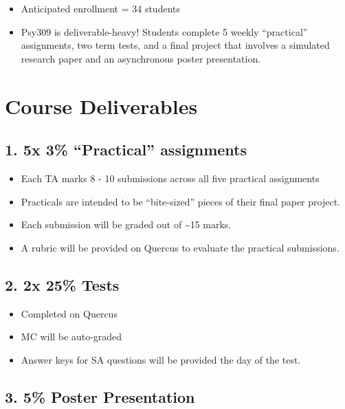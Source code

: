 \documentclass[
]{book}
\providecommand{\tightlist}{%
  \setlength{\itemsep}{0pt}\setlength{\parskip}{0pt}}
\begin{document}
\begin{itemize}
\item
  Anticipated enrollment = 34 students
\item
  Psy309 is deliverable-heavy! Students complete 5 weekly ``practical'' assignments, two term tests, and a final project that involves a simulated research paper and an asynchronous poster presentation.
\end{itemize}

\section*{Course Deliverables}\label{course-deliverables}

\subsection*{1. 5x 3\% ``Practical'' assignments}\label{x-3-practical-assignments}

\begin{itemize}
\tightlist
\item
  Each TA marks 8 - 10 submissions across all five practical assignments
\item
  Practicals are intended to be ``bite-sized'' pieces of their final paper project.
\item
  Each submission will be graded out of \textasciitilde15 marks.
\item
  A rubric will be provided on Quercus to evaluate the practical submissions.
\end{itemize}

\subsection*{2. 2x 25\% Tests}\label{x-25-tests}

\begin{itemize}
\tightlist
\item
  Completed on Quercus
\item
  MC will be auto-graded
\item
  Answer keys for SA questions will be provided the day of the test.
\end{itemize}

\subsection*{3. 5\% Poster Presentation}\label{poster-presentation}
\end{document}
